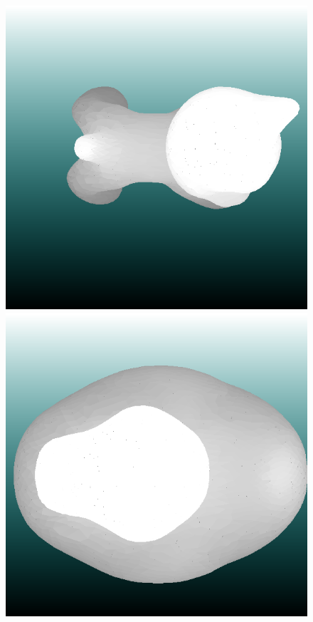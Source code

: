 \documentclass[10pt]{article}
\begin{document}
\begin{figure}[H]
\begin{center}
\includegraphics[scale=0.5]{cat.png}
\includegraphics[scale=0.5]{duck.png}
\end{center}
\end{figure}
\end{document}
